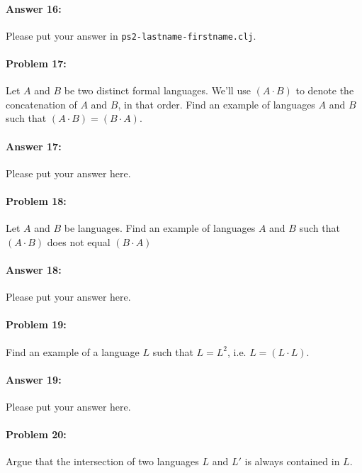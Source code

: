 \documentclass[10pt]{article}
\newcommand{\PSnum}{2}
\begin{document}
\paragraph{Answer 16:} Please put your answer in
\texttt{ps\PSnum-lastname-firstname.clj}.

\noindent\hrulefill %

\paragraph{Problem 17:}
Let $A$ and $B$ be two distinct formal languages. We'll use
$(A\cdot B)$ to denote the concatenation of $A$ and $B$, in
that order. Find an example of languages $A$ and $B$ such that
$(A\cdot B)=(B\cdot A)$.

\paragraph{Answer 17:} Please put your answer here.

\noindent\hrulefill %

\paragraph{Problem 18:}
Let $A$ and $B$ be languages. Find an example of languages $A$ and $B$
such that $(A\cdot B)$ does not equal $(B\cdot A)$

\paragraph{Answer 18:} Please put your answer here.

\noindent\hrulefill %

\paragraph{Problem 19:}
Find an example of a language $L$ such that $L=L^2$,
i.e. $L=(L\cdot L)$.

\paragraph{Answer 19:} Please put your answer here.

\noindent\hrulefill %

\paragraph{Problem 20:}
Argue that the intersection of two languages $L$ and $L'$ is always
contained in $L$.
\end{document}
